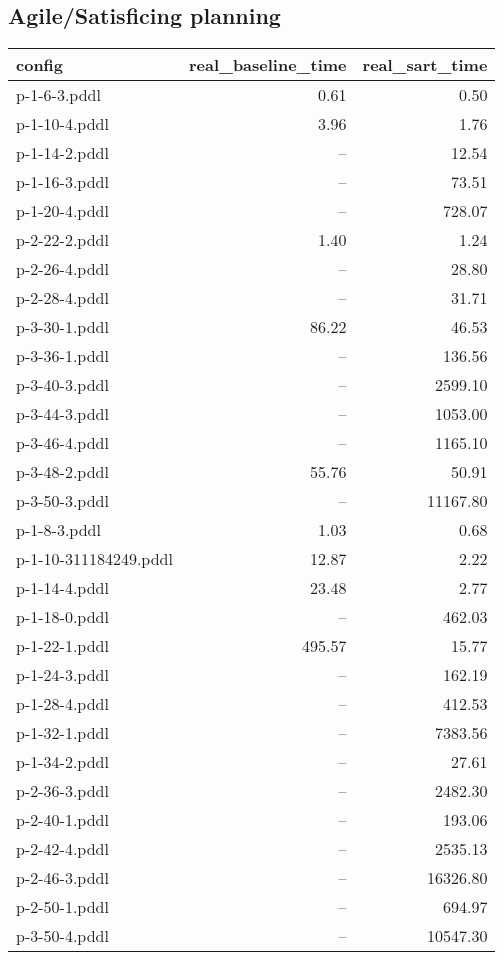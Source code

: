 \documentclass{article}
\begin{document}
                    \subsection*{Agile/Satisficing planning}
                    
                            \begin{center}
                            \scriptsize
                            \begin{tabular}{@{}l|r|r@{}}
                            config & real\_baseline\_time & real\_sart\_time\\\midrule
                             p-1-6-3.pddl&0.61&0.50\\
 p-1-10-4.pddl&3.96&1.76\\
 p-1-14-2.pddl&--&12.54\\
 p-1-16-3.pddl&--&73.51\\
 p-1-20-4.pddl&--&728.07\\
 p-2-22-2.pddl&1.40&1.24\\
 p-2-26-4.pddl&--&28.80\\
 p-2-28-4.pddl&--&31.71\\
 p-3-30-1.pddl&86.22&46.53\\
 p-3-36-1.pddl&--&136.56\\
 p-3-40-3.pddl&--&2599.10\\
 p-3-44-3.pddl&--&1053.00\\
 p-3-46-4.pddl&--&1165.10\\
 p-3-48-2.pddl&55.76&50.91\\
 p-3-50-3.pddl&--&11167.80\\
 p-1-8-3.pddl&1.03&0.68\\
 p-1-10-311184249.pddl&12.87&2.22\\
 p-1-14-4.pddl&23.48&2.77\\
 p-1-18-0.pddl&--&462.03\\
 p-1-22-1.pddl&495.57&15.77\\
 p-1-24-3.pddl&--&162.19\\
 p-1-28-4.pddl&--&412.53\\
 p-1-32-1.pddl&--&7383.56\\
 p-1-34-2.pddl&--&27.61\\
 p-2-36-3.pddl&--&2482.30\\
 p-2-40-1.pddl&--&193.06\\
 p-2-42-4.pddl&--&2535.13\\
 p-2-46-3.pddl&--&16326.80\\
 p-2-50-1.pddl&--&694.97\\
 p-3-50-4.pddl&--&10547.30
                            \end{tabular}
                            \end{center}
                    
\end{document}
